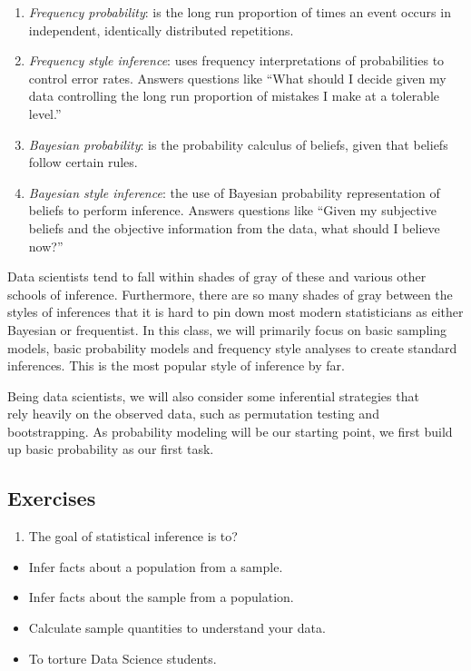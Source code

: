 \documentclass[]{article}
\begin{document}
\begin{enumerate}
\def\labelenumi{\arabic{enumi}.}
\itemsep1pt\parskip0pt
\item
  \emph{Frequency probability}: is the long run proportion of times an
  event occurs in independent, identically distributed repetitions.
\item
  \emph{Frequency style inference}: uses frequency interpretations of
  probabilities to control error rates. Answers questions like ``What
  should I decide given my data controlling the long run proportion of
  mistakes I make at a tolerable level.''
\item
  \emph{Bayesian probability}: is the probability calculus of beliefs,
  given that beliefs follow certain rules.
\item
  \emph{Bayesian style inference}: the use of Bayesian probability
  representation of beliefs to perform inference. Answers questions like
  ``Given my subjective beliefs and the objective information from the
  data, what should I believe now?''
\end{enumerate}

Data scientists tend to fall within shades of gray of these and various
other schools of inference. Furthermore, there are so many shades of
gray between the styles of inferences that it is hard to pin down most
modern statisticians as either Bayesian or frequentist. In this class,
we will primarily focus on basic sampling models, basic probability
models and frequency style analyses to create standard inferences. This
is the most popular style of inference by far.

Being data scientists, we will also consider some inferential strategies
that\\rely heavily on the observed data, such as permutation testing and
bootstrapping. As probability modeling will be our starting point, we
first build up basic probability as our first task.

\subsection{Exercises}\label{exercises}

\begin{enumerate}
\def\labelenumi{\arabic{enumi}.}
\itemsep1pt\parskip0pt
\item
  The goal of statistical inference is to?
\end{enumerate}

\begin{itemize}
\itemsep1pt\parskip0pt
\item
  Infer facts about a population from a sample.
\item
  Infer facts about the sample from a population.
\item
  Calculate sample quantities to understand your data.
\item
  To torture Data Science students.
\end{itemize}
\end{document}
